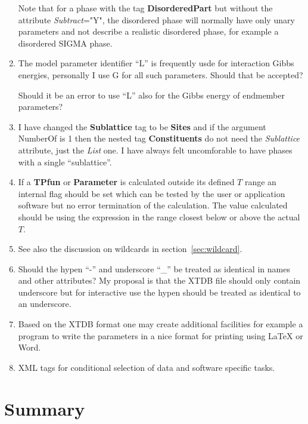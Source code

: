 \documentclass{article}
\begin{document}
\begin{enumerate}
  Note that for a phase with the tag {\bf DisorderedPart} but without
  the attribute {\em Subtract}="Y", the disordered phase will normally
  have only unary parameters and not describe a realistic disordered
  phase, for example a disordered SIGMA phase.

\item The model parameter identifier ``L'' is frequently usde for
  interaction Gibbs energies, personally I use G for all such
  parameters.  Should that be accepted?

  Should it be an error to use ``L'' also for the Gibbs energy of
  endmember parameters?

\item I have changed the {\bf Sublattice} tag to be {\bf Sites} and if
  the argument NumberOf is 1 then the nested tag {\bf Constituents} do
  not need the {\em Sublattice} attribute, just the {\em List} one.  I
  have always felt uncomforable to have phases with a single
  ``sublattice''.

\item If a {\bf TPfun} or {\bf Parameter} is calculated outside its
  defined $T$ range an internal flag should be set which can be tested
  by the user or application software but no error termination of the
  calculation.  The value calculated should be using the expression in
  the range closest below or above the actual $T$.

\item See also the discussion on wildcards in section~\ref{sec:wildcard}.

\item Should the hypen ``-'' and underscore ``\_'' be treated as
  identical in names and other attributes?  My proposal is that the
  XTDB file should only contain underscore but for interactive use the
  hypen should be treated as identical to an underscore.

\item Based on the XTDB format one may create additional facilities
  for example a program to write the parameters in a nice format for
  printing using LaTeX or Word.

\item XML tags for conditional selection of data and software specific
  tasks.
  
\end{enumerate}

\section{Summary}
\end{document}
